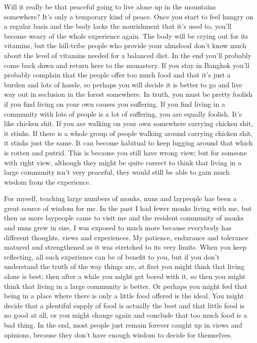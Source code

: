 Will it really be that peaceful going to live alone up in the mountains somewhere? It's only a temporary kind of peace. Once you start to feel hungry on a regular basis and the body lacks the nourishment that it's used to, you'll become weary of the whole experience again. The body will be crying out for its vitamins, but the hill-tribe people who provide your almsfood don't know much about the level of vitamins needed for a balanced diet. In the end you'll probably come back down and return here to the monastery. If you stay in Bangkok you'll probably complain that the people offer too much food and that it's just a burden and lots of hassle, so perhaps you will decide it is better to go and live way out in seclusion in the forest somewhere. In truth, you must be pretty foolish if you find living on your own causes you suffering. If you find living in a community with lots of people is a lot of suffering, you are equally foolish. It's like chicken shit. If you are walking on your own somewhere carrying chicken shit, it stinks. If there is a whole group of people walking around carrying chicken shit, it stinks just the same. It can become habitual to keep lugging around that which is rotten and putrid. This is because you still have wrong view; but for someone with right view, although they might be quite correct to think that living in a large community isn't very peaceful, they would still be able to gain much wisdom from the experience.

For myself, teaching large numbers of monks, nuns and laypeople has been a great source of wisdom for me. In the past I had fewer monks living with me, but then as more laypeople came to visit me and the resident community of monks and nuns grew in size, I was exposed to much more because everybody has different thoughts, views and experiences. My patience, endurance and tolerance matured and strengthened as it was stretched to its very limits. When you keep reflecting, all such experience can be of benefit to you, but if you don't understand the truth of the way things are, at first you might think that living alone is best; then after a while you might get bored with it, so then you might think that living in a large community is better. Or perhaps you might feel that being in a place where there is only a little food offered is the ideal. You might decide that a plentiful supply of food is actually the best and that little food is no good at all, or you might change again and conclude that too much food is a bad thing. In the end, most people just remain forever caught up in views and opinions, because they don't have enough wisdom to decide for themselves.

